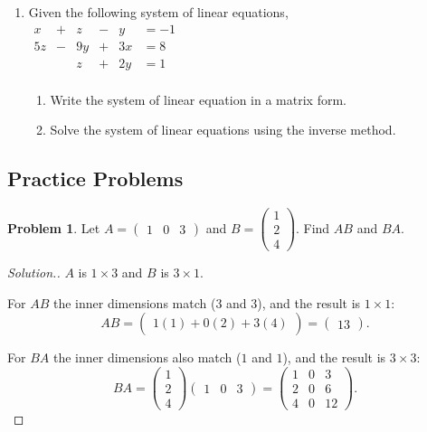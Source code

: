 \documentclass[11pt,a4paper]{article}
\theoremstyle{definition}
\newtheorem{problemx}{Problem}[section]
\newenvironment{problem}{\begin{problemx}}{\end{problemx}}
\newenvironment{solution}
  {\renewcommand{\qedsymbol}{}\begin{proof}[\textit{Solution}.]}
  {\end{proof}}
\begin{document}
\begin{enumerate}
\item Given the following system of linear equations,\\
$
\begin{matrix}
x & + & z & - & y & = -1\\
5z & - & 9y & +& 3x & = 8\\
&& z & + & 2y & =1\\
\end{matrix}
$\\

\begin{enumerate}
\item Write the system of linear equation in a matrix form.
\item Solve the system of linear equations using the inverse method.\\
\end{enumerate}
\end{enumerate}







\pagebreak

\subsection{Practice Problems}

\begin{problem}
Let $A=\begin{pmatrix}1&0&3\end{pmatrix}$ and
$B=\begin{pmatrix}1\\2\\4\end{pmatrix}$. Find $AB$ and $BA$.
\end{problem}

\begin{solution}
$A$ is $1\times 3$ and $B$ is $3\times 1$.

For $AB$ the inner dimensions match ($3$ and $3$), and the result is
$1\times 1$:
$$AB=\begin{pmatrix}1(1)+0(2)+3(4)\end{pmatrix}=\begin{pmatrix}13\end{pmatrix}.$$

For $BA$ the inner dimensions also match ($1$ and $1$), and the result is
$3\times 3$:
$$BA=\begin{pmatrix}1\\2\\4\end{pmatrix}\begin{pmatrix}1&0&3\end{pmatrix}
=\begin{pmatrix}1&0&3\\2&0&6\\4&0&12\end{pmatrix}.$$
\end{solution}
\end{document}
